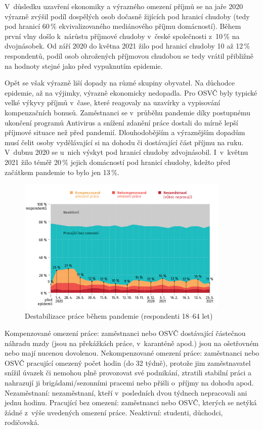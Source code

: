 V důsledku uzavření ekonomiky a výrazného omezení příjmů se na jaře 2020 výrazně zvýšil podíl dospělých osob dočasně žijících pod hranicí chudoby (tedy pod hranicí 60\,\% ekvivalizovaného mediánového příjmu domácností). Během první vlny došlo k nárůstu
příjmové chudoby v české společnosti z 10\,\% na dvojnásobek. Od září 2020 do května 2021 žilo pod hranicí chudoby 10 až 12\,\% respondentů, podíl osob ohrožených příjmovou chudobou se tedy vrátil přibližně na hodnoty stejné jako před vypuknutím epidemie.

Opět se však výrazně liší dopady na různé skupiny obyvatel. Na důchodce epidemie, až na výjimky, výrazně ekonomicky nedopadla. Pro OSVČ byly typické velké výkyvy příjmů v čase, které reagovaly na uzavírky a vypisování kompenzačních bonusů. Zaměstnanci se v průběhu pandemie díky postupnému ukončení programů Antivirus a snížení zdanění práce dostali do mírně lepší příjmové situace než před pandemií. Dlouhodobějším a výraznějším dopadům musí čelit osoby vydělávající si na dohodu či dostávající část příjmu na ruku. V dubnu 2020 se u~nich výskyt pod hranicí chudoby zdvojnásobil. I~v květnu 2021 žilo téměř 20\,\% jejich domácností pod hranicí chudoby, kdežto před začátkem pandemie to bylo jen 13\,\%.


\begin{figure}[ht]
    \centering
    \includegraphics[width=0.9\textwidth]{./pic/zbp-graf1.png}
    \caption{Destabilizace práce během pandemie (respondenti 18--64 let)}
    \label{fig:zbp1}
\end{figure}

Kompenzované omezení práce: zaměstnanci nebo OSVČ dostávající částečnou náhradu mzdy (jsou na překážkách práce, v~karanténě apod.) jsou na ošetřovném nebo mají nucenou dovolenou. Nekompenzované omezení práce: zaměstnanci nebo OSVČ pracující omezený počet hodin (do 32 týdně), protože jim zaměstnavatel snížil úvazek či nemohou plně provozovat své podnikání, ztratili stabilní práci a nahrazují ji brigádami/sezonními pracemi nebo přišli o~příjmy na dohodu apod. Nezaměstnaní: nezaměstnaní, kteří v~posledních dvou týdnech nepracovali ani jednu hodinu. Pracující bez omezení: zaměstnanci nebo OSVČ, kterých se netýká žádné z~výše uvedených omezení práce. Neaktivní: studenti, důchodci, rodičovská.

